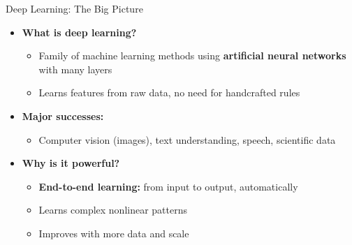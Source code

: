 \documentclass[aspectratio=169]{beamer}
\begin{document}
\begin{frame}{Deep Learning: The Big Picture}
    \begin{itemize}
        \item \textbf{What is deep learning?}
        \begin{itemize}
            \item Family of machine learning methods using \textbf{artificial neural networks} with many layers 
            \item Learns features from raw data, no need for handcrafted rules
        \end{itemize}
        \vspace{0.7em}
        \item \textbf{Major successes:}
        \begin{itemize}
            \item Computer vision (images), text understanding, speech, scientific data
        \end{itemize}
        \vspace{0.7em}
        \item \textbf{Why is it powerful?}
        \begin{itemize}
            \item \textbf{End-to-end learning:} from input to output, automatically
            \item Learns complex nonlinear patterns
            \item Improves with more data and scale
        \end{itemize}
    \end{itemize}
\end{frame}
\end{document}
